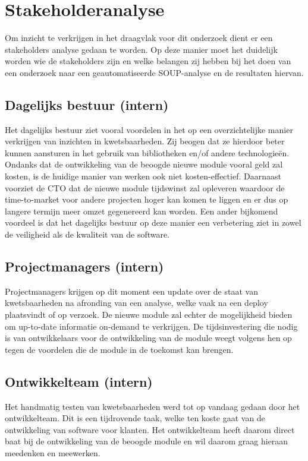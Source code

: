 \section{Stakeholderanalyse}\label{sec:stakeholdersanalyse}
Om inzicht te verkrijgen in het draagvlak voor dit onderzoek dient er een stakeholders analyse gedaan te worden. Op deze manier moet het duidelijk worden wie de stakeholders zijn en welke belangen zij hebben bij het doen van een onderzoek naar een geautomatiseerde SOUP-analyse en de resultaten hiervan.

\subsection{Dagelijks bestuur (intern)}\label{subsec:dagelijks-bestuur-(intern)}
Het dagelijks bestuur ziet vooral voordelen in het op een overzichtelijke manier verkrijgen van inzichten in kwetsbaarheden. Zij beogen dat ze hierdoor beter kunnen aansturen in het gebruik van bibliotheken en/of andere technologieën. Ondanks dat de ontwikkeling van de beoogde nieuwe module vooral geld zal kosten, is de huidige manier van werken ook niet kosten-effectief. Daarnaast voorziet de CTO dat de nieuwe module tijdswinst zal opleveren waardoor de time-to-market voor andere projecten hoger kan komen te liggen en er dus op langere termijn meer omzet gegenereerd kan worden.
Een ander bijkomend voordeel is dat het dagelijks bestuur op deze manier een verbetering ziet in zowel de veiligheid als de kwaliteit van de software.
\subsection{Projectmanagers (intern)}\label{subsec:projectmanagers-(intern)}
Projectmanagers krijgen op dit moment een update over de staat van kwetsbaarheden na afronding van een analyse, welke vaak na een deploy plaatsvindt of op verzoek. De nieuwe module zal echter de mogelijkheid bieden om up-to-date informatie on-demand te verkrijgen.
De tijdsinvestering die nodig is van ontwikkelaars voor de ontwikkeling van de module weegt volgens hen op tegen de voordelen die de module in de toekomst kan brengen.

\subsection{Ontwikkelteam (intern)}\label{subsec:ontwikkelteam-(intern)}
Het handmatig testen van kwetsbaarheden werd tot op vandaag gedaan door het ontwikkelteam. Dit is een tijdrovende taak, welke ten koste gaat van de ontwikkeling van software voor klanten. Het ontwikkelteam heeft daarom direct baat bij de ontwikkeling van de beoogde module en wil daarom graag hieraan meedenken en meewerken.

